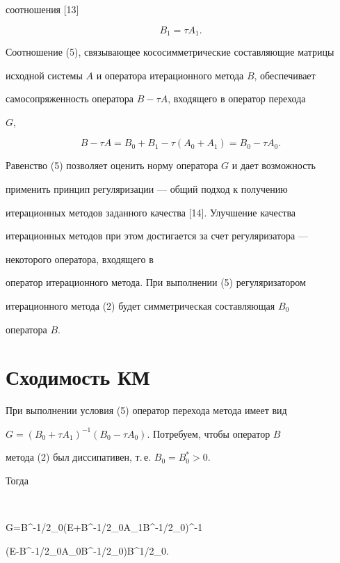 соотношения [13] 


\begin{equation} 


B_1=\tau A_1. 


\end{equation} 


Соотношение (5), связывающее кососимметрические составляющие матрицы 


исходной системы $A$ и оператора итерационного метода $B$, обеспечивает 


самосопряженность оператора $B-\tau A$, входящего в оператор перехода 


$G$, 


$$ 


B-\tau A=B_0+B_1-\tau(A_0+A_1)=B_0-\tau A_0. 


$$ 


Равенство (5) позволяет оценить норму оператора $G$ и дает возможность 


применить принцип регуляризации --- общий подход к получению 


итерационных методов заданного качества [14]. Улучшение качества 


итерационных методов при этом достигается за счет регуляризатора --- 


некоторого оператора, входящего в 


оператор итерационного метода. При выполнении (5) регуляризатором 


итерационного метода (2) будет симметрическая составляющая $B_0$ 


оператора $B$. 


 


\section{Сходимость КМ} 


 


При выполнении условия (5) оператор перехода метода имеет вид 


$G=(B_0+\tau A_1)^{-1}(B_0-\tau A_0)$. Потребуем, чтобы оператор $B$ 


метода (2) был диссипативен, т.\,е. $B_0=B^*_0>0$. 


Тогда 


$$ 


G=B^{-1/2}_0(E+\tau B^{-1/2}_0A_1B^{-1/2}_0)^{-1} 


(E-\tau B^{-1/2}_0A_0B^{-1/2}_0)B^{1/2}_0. 


